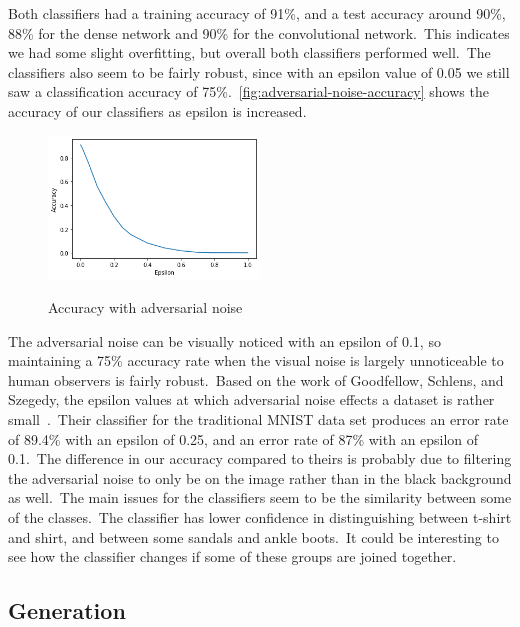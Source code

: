 \documentclass[conference]{IEEEtran}
\begin{document}
    Both classifiers had a training accuracy of 91\%, and a test accuracy around 90\%, 88\% for the dense network and 90\% for the convolutional network.\ This indicates we had some slight overfitting, but overall both classifiers performed well.\ The classifiers also seem to be fairly robust, since with an epsilon value of 0.05 we still saw a classification accuracy of 75\%.~\autoref{fig:adversarial-noise-accuracy} shows the accuracy of our classifiers as epsilon is increased.
    \begin{figure}[!h]
        \begin{center}
            \caption{Accuracy with adversarial noise}
            \includegraphics[width=0.5\textwidth]{Adversarial Accuracy.png}
            \label{fig:adversarial-noise-accuracy}
        \end{center}
    \end{figure}
    The adversarial noise can be visually noticed with an epsilon of 0.1, so maintaining a 75\% accuracy rate when the visual noise is largely unnoticeable to human observers is fairly robust.\ Based on the work of Goodfellow, Schlens, and Szegedy, the epsilon values at which adversarial noise effects a dataset is rather small~\cite{adversarialexamples}.\ Their classifier for the traditional MNIST data set produces an error rate of 89.4\% with an epsilon of 0.25, and an error rate of 87\% with an epsilon of 0.1.\ The difference in our accuracy compared to theirs is probably due to filtering the adversarial noise to only be on the image rather than in the black background as well.\ The main issues for the classifiers seem to be the similarity between some of the classes.\ The classifier has lower confidence in distinguishing between t-shirt and shirt, and between some sandals and ankle boots.\ It could be interesting to see how the classifier changes if some of these groups are joined together.

    \subsection{Generation}\label{subsec:results-generation}
\end{document}

